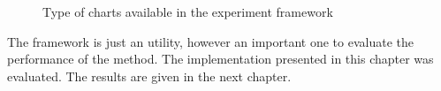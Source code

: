 \begin{figure}
  \centering
  \caption{Type of charts available in the experiment framework}
  \label{chart_examples2}
\end{figure}

The framework is just an utility, however an important one to evaluate the
performance of the method. The implementation presented in this chapter was
evaluated. The results are given in the next chapter.
